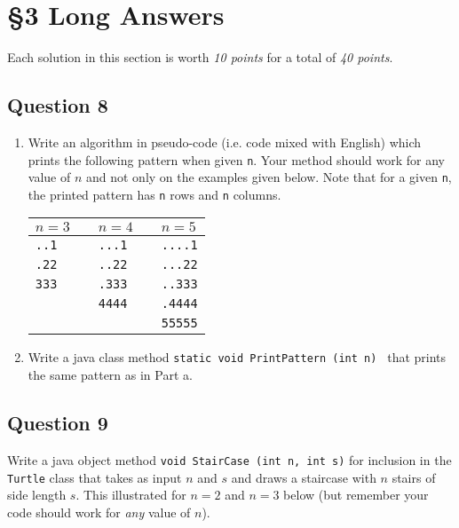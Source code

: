 \clearpage
\section*{\S 3 Long Answers}
Each solution in this section is worth \emph{10 points} for a total of \emph{40 points}.\\

\subsection*{Question 8}
\begin{enumerate}
\item Write an algorithm in pseudo-code (i.e. code mixed with English) which prints the following pattern when given \texttt{n}. Your method should work for any value of $n$ and not only on the examples given below.
Note that for a given \texttt{n}, the printed pattern has \texttt{n} rows
and \texttt{n} columns.

\begin{center}
\begin{tabular}{l  c l c l }
$n=3$ 		&\hspace{50px}\hfill	& $n=4$ 		&\hspace{50px}\hfill& $n=5$ \\
\hline
\texttt{..1}		&&\texttt{...1}		&& \texttt{....1} \\
\texttt{.22}		&&\texttt{..22}		&& \texttt{...22} \\
\texttt{333}	&&\texttt{.333}		&& \texttt{..333} \\
			&&\texttt{4444}		&& \texttt{.4444} \\
			&&				&& \texttt{55555} \\
\hline
\end{tabular}
\end{center}

\hspace{-0.55cm}\AnsBox{10cm} \clearpage

\item Write a java class method \texttt{static void PrintPattern (int n) } that prints the same pattern as in Part a.

\hspace{-0.55cm}\AnsBox{20cm}

\end{enumerate}

\clearpage
\subsection*{Question 9}
Write a java object method \texttt{void StairCase (int n, int s)} for inclusion in the \texttt{Turtle} class that takes as input $n$ and $s$ and draws a staircase with $n$ stairs of side length $s$. This illustrated for $n=2$ and $n=3$ below (but remember your code should work for \emph{any} value of $n$).

